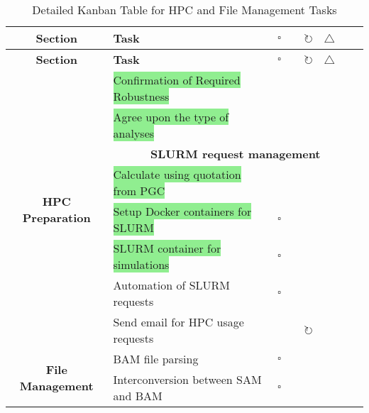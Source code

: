 \documentclass[11pt]{report}
\newcommand{\done}{\checkmark}
\newcommand{\pending}{$\square$}
\newcommand{\refine}{$\circlearrowright$}
\newcommand{\issue}{$\triangle$}
\newcommand{\draft}{\faPencil}
\newcommand{\moved}{\faArrowCircleRight}
\newcommand{\highlightessential}[1]{\colorbox{lightgreen}{#1}}
\newcommand{\highlightoptional}[1]{\colorbox{lightorange}{#1}}
\begin{document}
\begin{longtable}{|c|p{8cm}|c|c|c|c|c|c|}
	\caption[Kanban Table]{Detailed Kanban Table for HPC and File Management Tasks} \\  %
	\hline
	\textbf{Section} & \textbf{Task} & \textbf{\pending} & \textbf{\draft} & \textbf{\refine} & \textbf{\issue} & \textbf{\moved} & \textbf{\done} \\ \hline
	\endfirsthead
	\hline
	\textbf{Section} & \textbf{Task} & \textbf{\pending} & \textbf{\draft} & \textbf{\refine} & \textbf{\issue} & \textbf{\moved} & \textbf{\done} \\ \hline
	\endhead
	
	\multirow{8}{*}{\textbf{HPC Preparation}} 
	& \highlightessential{Confirmation of Required Robustness} & & & & & & \done \\ 
	& \highlightessential{Agree upon the type of analyses} & & & & & \moved & \\ 
	& \multicolumn{7}{c|}{\textbf{SLURM request management}} \\
	& \highlightessential{Calculate using quotation from PGC} & & & & & & \done \\ 
	& \highlightessential{Setup Docker containers for SLURM} & \pending & & & & & \\
	& \highlightessential{SLURM container for simulations} & \pending & & & & & \\ 
	& \highlightoptional{Automation of SLURM requests} & \pending & & & & & \\
	& \highlightoptional{Send email for HPC usage requests} & & & \refine & & & \\ \hline
	
	\multirow{2}{*}{\textbf{File Management}} 
	& \highlightoptional{BAM file parsing} & \pending & & & & & \\
	& \highlightoptional{Interconversion between SAM and BAM} & \pending & & & & & \\ \hline
	

\end{longtable}
\end{document}
